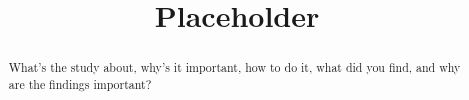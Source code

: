 \documentclass[linenumbers,amsmath,trackchanges]{aastex702}
\begin{document}
\title{Placeholder}




\begin{abstract}
What's the study about, why's it important, how to do it, what did you find, and why are the findings 
important?\\
\end{abstract}

\end{document}
